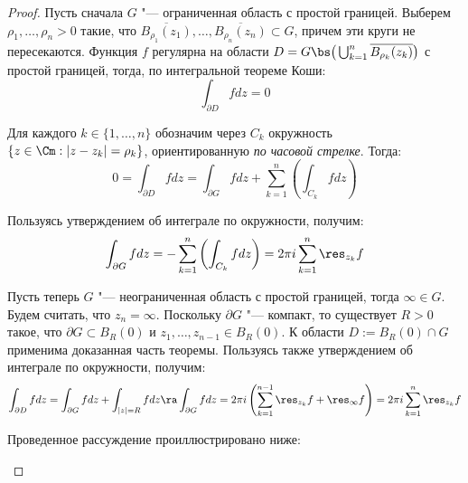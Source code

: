 \begin{proof}
	Пусть сначала $G$ "--- ограниченная область с простой границей. Выберем $\rho_1, \dotsc, \rho_n > 0$ такие, что $\overline{B_{\rho_1}(z_1)}, \dotsc, \overline{B_{\rho_n}(z_n)} \subset G$, причем эти круги не пересекаются. Функция $f$ регулярна на области $D = G \bs \big(\bigcup_{k = 1}^n\overline{B_{\rho_k}(z_k)}\big)$ с простой границей, тогда, по интегральной теореме Коши:
	\[\int_{\partial D} fdz = 0\]
	
	Для каждого $k \in \{1, \dotsc, n\}$ обозначим через $C_k$ окружность $\{z \in \Cm: |z - z_k| = \rho_k\}$, ориентированную \textit{по часовой стрелке}. Тогда:
	\[0 = \int_{\partial D} fdz = \int_{\partial G} fdz + \sum_{k = 1}^n\left(\int_{C_k}fdz\right)\]
	
	Пользуясь утверждением об интеграле по окружности, получим:
	\[\int_{\partial G} fdz = -\sum_{k = 1}^n\left(\int_{C_k}fdz\right) = 2 \pi i\sum_{k = 1}^n\res_{z_k}f\]
	
	Пусть теперь $G$ "--- неограниченная область с простой границей, тогда $\infty \in G$. Будем считать, что $z_n = \infty$. Поскольку $\partial G$ "--- компакт, то существует $R > 0$ такое, что $\partial G \subset B_R(0)$ и $z_1, \dotsc, z_{n-1} \in B_R(0)$. К области $D := B_R(0) \cap G$ применима доказанная часть теоремы. Пользуясь также утверждением об интеграле по окружности, получим:
	\[\int_{\partial D} fdz = \int_{\partial G}fdz + \int_{|z| = R}fdz \ra \int_{\partial G}fdz = 2\pi i\left(\sum_{k = 1}^{n-1}\res_{z_k}f + \res_{\infty}f\right) = 2\pi i\sum_{k = 1}^{n}\res_{z_k}f\]
	
	Проведенное рассуждение проиллюстрировано ниже:
	\begin{center}
\end{center}
\end{proof}
